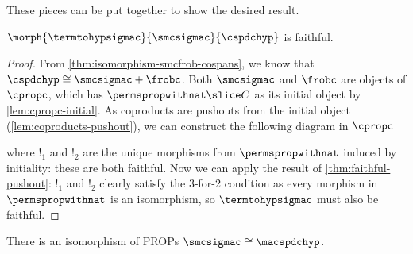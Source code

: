 These pieces can be put together to show the desired result.

\begin{proposition}
    \(\morph{\termtohypsigmac}{\smcsigmac}{\cspdchyp}\) is faithful.
\end{proposition}
\begin{proof}
    From \cref{thm:isomorphism-smcfrob-cospans}, we know that
    \(\cspdchyp \cong \smcsigmac + \frobc\).
    Both \(\smcsigmac\) and \(\frobc\) are objects of \(\cpropc\), which has
    \(\permspropwithnat \slice C\) as its initial object by
    \cref{lem:cpropc-initial}.
    As coproducts are pushouts from the initial object
    (\cref{lem:coproducts-pushout}), we can construct the following diagram in
    \(\cpropc\)
    \begin{center}
        
    \end{center}
    where \(!_1\) and \(!_2\) are the unique morphisms from
    \(\permspropwithnat\) induced by initiality: these are both faithful.
    Now we can apply the result of \cref{thm:faithful-pushout}: \(!_1\) and
    \(!_2\) clearly satisfy the 3-for-2 condition as every morphism in
    \(\permspropwithnat\) is an isomorphism, so \(\termtohypsigmac\) must also
    be faithful.
\end{proof}

\begin{corollary}
    There is an isomorphism of PROPs \(\smcsigmac \cong \macspdchyp\).
\end{corollary}